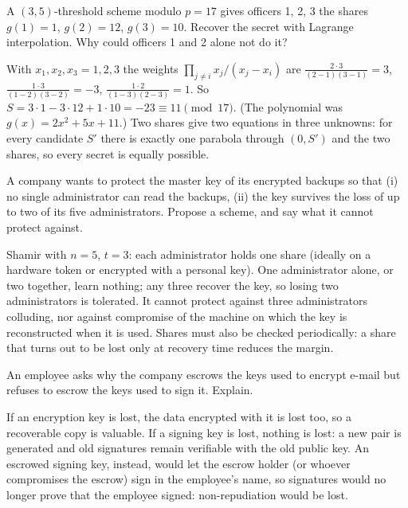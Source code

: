 \begin{exercise}
A $(3,5)$-threshold scheme modulo $p = 17$ gives officers 1, 2, 3 the shares $g(1) = 1$, $g(2) = 12$, $g(3) = 10$. Recover the secret with Lagrange interpolation. Why could officers 1 and 2 alone not do it?
\end{exercise}
\begin{solution}
With $x_1, x_2, x_3 = 1, 2, 3$ the weights $\prod_{j \neq i} x_j / (x_j - x_i)$ are
$\frac{2 \cdot 3}{(2-1)(3-1)} = 3$, $\frac{1 \cdot 3}{(1-2)(3-2)} = -3$, $\frac{1 \cdot 2}{(1-3)(2-3)} = 1$.
So $S = 3 \cdot 1 - 3 \cdot 12 + 1 \cdot 10 = -23 \equiv 11 \pmod{17}$. (The polynomial was $g(x) = 2x^2 + 5x + 11$.) Two shares give two equations in three unknowns: for every candidate $S'$ there is exactly one parabola through $(0, S')$ and the two shares, so every secret is equally possible.
\end{solution}

\begin{exercise}
A company wants to protect the master key of its encrypted backups so that (i) no single administrator can read the backups, (ii) the key survives the loss of up to two of its five administrators. Propose a scheme, and say what it cannot protect against.
\end{exercise}
\begin{solution}
Shamir with $n = 5$, $t = 3$: each administrator holds one share (ideally on a hardware token or encrypted with a personal key). One administrator alone, or two together, learn nothing; any three recover the key, so losing two administrators is tolerated. It cannot protect against three administrators colluding, nor against compromise of the machine on which the key is reconstructed when it is used. Shares must also be checked periodically: a share that turns out to be lost only at recovery time reduces the margin.
\end{solution}

\begin{exercise}
An employee asks why the company escrows the keys used to encrypt e-mail but refuses to escrow the keys used to sign it. Explain.
\end{exercise}
\begin{solution}
If an encryption key is lost, the data encrypted with it is lost too, so a recoverable copy is valuable. If a signing key is lost, nothing is lost: a new pair is generated and old signatures remain verifiable with the old public key. An escrowed signing key, instead, would let the escrow holder (or whoever compromises the escrow) sign in the employee's name, so signatures would no longer prove that the employee signed: non-repudiation would be lost.
\end{solution}
